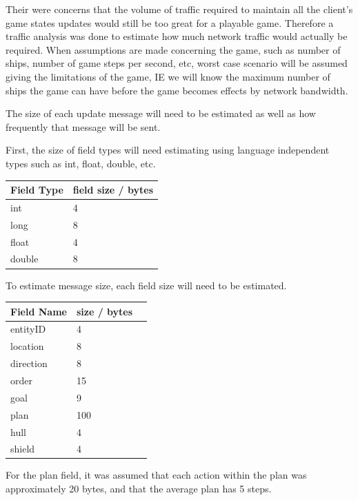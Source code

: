 Their were concerns that the volume of traffic required to maintain all the client's game states updates would still be too great for a playable game.
Therefore a traffic analysis was done to estimate how much network traffic would actually be required.
When assumptions are made concerning the game, such as number of ships, number of game steps per second, etc, worst case scenario will be assumed giving the limitations of the game, IE we will know the maximum number of ships the game can have before the game becomes effects by network bandwidth.



The size of each update message will need to be estimated as well as how frequently that message will be sent.

First, the size of field types will need estimating using language independent types such as int, float, double, etc.
\begin{center}
    \begin{tabular}{| l | l |}
    \hline
    Field Type & field size / bytes \\ \hline
    int & 4 \\ \hline
    long & 8 \\ \hline
    float & 4 \\ \hline
    double & 8 \\
    \hline
    \end{tabular}
\end{center}

To estimate message size, each field size will need to be estimated.
\begin{center}
    \begin{tabular}{| l | l | l |}
    \hline
    Field Name & size / bytes \\ \hline
    entityID & 4 \\ \hline
    location & 8 \\ \hline
    direction & 8 \\ \hline
    order & 15 \\ \hline
    goal & 9 \\ \hline
    plan & 100 \\ \hline
    hull & 4  \\ \hline
    shield & 4  \\
    \hline
    \end{tabular}
\end{center}

For the plan field, it was assumed that each action within the plan was approximately 20 bytes, and that the average plan has 5 steps.


